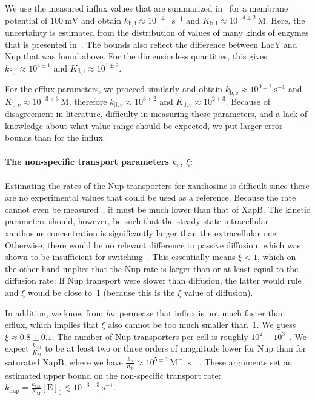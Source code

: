 \documentclass[10pt,letterpaper]{article}
\newcommand{\n}[1]{\mathrm{#1}}
\begin{document}
We use the measured influx values that are summarized in~\cite{Viitanen1984} for a membrane potential of $100~\n{mV}$ and obtain $k_{\n{b,i}} \approx 10^{1 \pm 1}~\n{s^{-1}}$ and $K_{\n{b,i}} \approx 10^{-4 \pm 2}~\n{M}$. Here, the uncertainty is estimated from the distribution of values of many kinds of enzymes that is presented in~\cite{Milo2016}. The bounds also reflect the difference between LacY and Nup that was found above. 
For the dimensionless quantities, this gives $k_{\n{\beta,i}} \approx 10^{4 \pm 1}$ and $K_{\n{\beta,i}} \approx 10^{1 \pm 2}$. 

For the efflux parameters, we proceed similarly and obtain $k_{\n{b,e}} \approx 10^{0 \pm 2}~\n{s^{-1}}$ and $K_{\n{b,e}} \approx 10^{-3 \pm 3}~\n{M}$, therefore $k_{\n{\beta,e}} \approx 10^{3 \pm 2}$ and $K_{\n{\beta,e}} \approx 10^{2 \pm 3}$. Because of disagreement in literature, difficulty in measuring these parameters, and a lack of knowledge about what value range should be expected, we put larger error bounds than for the influx. 

\paragraph*{The non-specific transport parameters $k_{\n{\eta}}$, $\xi$:} Estimating the rates of the Nup transporters for xanthosine is difficult since there are no experimental values that could be used as a reference. Because the rate cannot even be measured~\cite{Norholm2001}, it must be much lower than that of XapB. The kinetic parameters should, however, be such that the steady-state intracellular xanthosine concentration is significantly larger than the extracellular one. Otherwise, there would be no relevant difference to passive diffusion, which was shown to be insufficient for switching~\cite{Norholm2001}. This essentially means $\xi < 1$, which on the other hand implies that the Nup rate is larger than or at least equal to the diffusion rate: If Nup transport were slower than diffusion, the latter would rule and $\xi$ would be close to~1 (because this is the $\xi$ value of diffusion). 

In addition, we know from \emph{lac} permease that influx is not much faster than efflux, which implies that $\xi$ also cannot be too much smaller than~1.
We guess $\xi \approx 0.8 \pm 0.1$. The number of Nup transporters per cell is roughly $10^2-10^3$~\cite{Li2014}. We expect $\frac{k_{\n{cat}}}{K_{\n{M}}}$ to be at least two or three orders of magnitude lower for Nup than for saturated XapB, where we have $\frac{k_{\n{b}}}{K_{\n{b}}} \approx 10^{5 \pm 3}~\n{M^{-1}\ s^{-1}}$.
These arguments set an estimated upper bound on the non-specific transport rate: $k_{\n{nup}} = \frac{k_{\n{cat}}}{K_{\n{M}}} \n{[E]_0} \lesssim 10^{-3 \pm 3}~\n{s^{-1}}$. 
\end{document}
